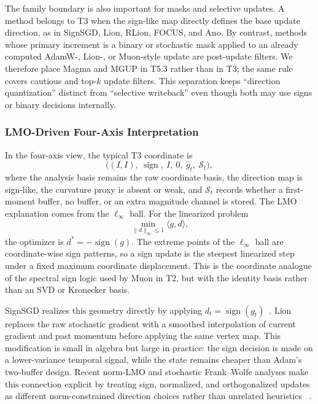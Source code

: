 The family boundary is also important for masks and selective updates.  A
method belongs to T3 when the sign-like map directly defines the base update
direction, as in SignSGD, Lion, RLion, FOCUS, and Ano.  By contrast, methods
whose primary increment is a binary or stochastic mask applied to an already
computed AdamW-, Lion-, or Muon-style update are post-update filters.  We
therefore place Magma and MGUP in T5.3 rather than in T3; the
same rule covers cautious and top-$k$ update filters.  This separation keeps
``direction quantization'' distinct from ``selective writeback'' even though
both may use signs or binary decisions internally.

\subsubsection{LMO-Driven Four-Axis Interpretation}
\label{sec:t3-lmo-four-axis}

In the four-axis view, the typical T3 coordinate is
\begin{equation}
  \big((I,I),\ \operatorname{sign},\ I,\ 0,\ \widehat{g}_t,\ \mathcal{S}_t\big),
\end{equation}
where the analysis basis remains the raw coordinate basis, the direction map
is sign-like, the curvature proxy is absent or weak, and
$\mathcal{S}_t$ records whether a first-moment buffer, no buffer, or an
extra magnitude channel is stored.  The LMO explanation comes from the
$\ell_\infty$ ball.  For the linearized problem
\begin{equation}
  \min_{\|d\|_\infty\leq 1}\langle g,d\rangle ,
\end{equation}
the optimizer is $d^*=-\operatorname{sign}(g)$.  The extreme points of the
$\ell_\infty$ ball are coordinate-wise sign patterns, so a sign update is the
steepest linearized step under a fixed maximum coordinate displacement.
This is the coordinate analogue of the spectral sign logic used by Muon in
T2, but with the identity basis rather than an SVD or Kronecker basis.

SignSGD realizes this geometry directly by applying
$d_t=\operatorname{sign}(g_t)$~\citep{bernstein2018signsgd}.  Lion replaces
the raw stochastic gradient with a smoothed interpolation of current gradient
and past momentum before applying the same vertex map.  This modification is
small in algebra but large in practice: the sign decision is made on a
lower-variance temporal signal, while the state remains cheaper than Adam's
two-buffer design.  Recent norm-LMO and stochastic Frank--Wolfe analyses
make this connection explicit by treating sign, normalized, and
orthogonalized updates as different norm-constrained direction choices rather
than unrelated heuristics
~\citep{bernstein2024oldoptimizer,pethick2025normlmo,sfyraki2025lions}.

